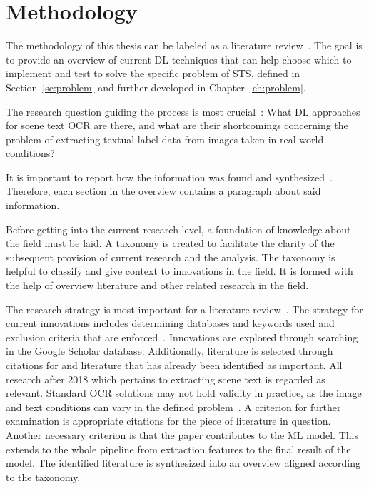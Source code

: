 \section{Methodology}\label{se:methodology}
The methodology of this thesis can be labeled as a literature review~\citep{snyder_literature_2019,
torraco_writing_2005}.
The goal is to provide an overview of current \ac{DL} techniques that can help choose
which to implement and test to solve the specific problem of \ac{STS}, defined in
Section~\ref{se:problem} and further developed in Chapter~\ref{ch:problem}.

The research question guiding the process is most crucial~\citep{snyder_literature_2019}:
What \ac{DL} approaches for scene text \ac{OCR} are there, and what are their shortcomings concerning
the problem of extracting textual label data from images taken in real-world conditions?

It is important to report how the information was found and
synthesized~\citep{torraco_writing_2005}.
Therefore, each section in the overview contains a paragraph about said information.

Before getting into the current research level, a foundation of knowledge about the field must be
laid.
A taxonomy is created to facilitate the clarity of the subsequent provision of current research and
the analysis.
The taxonomy is helpful to classify and give context to innovations in the field.
It is formed with the help of overview literature and other related research in the field.

The research strategy is most important for a literature
review~\citep{snyder_literature_2019}.
The strategy for current innovations includes determining databases and keywords
used and exclusion criteria that are enforced~\citep{torraco_writing_2005}.
Innovations are explored through searching in the Google Scholar database.
Additionally, literature is selected through citations for and literature that has already been
identified as important.
All research after 2018 which pertains to extracting scene text is regarded as relevant.
Standard \ac{OCR} solutions may not hold validity in practice, as the image and text conditions can
vary in the defined problem~\citep{chen_text_2021}.
A criterion for further examination is appropriate citations for the piece of literature
in question.
Another necessary criterion is that the paper contributes to the \ac{ML} model.
This extends to the whole pipeline from extraction features to the final result of the model.
The identified literature is synthesized into an overview aligned according to the taxonomy.

